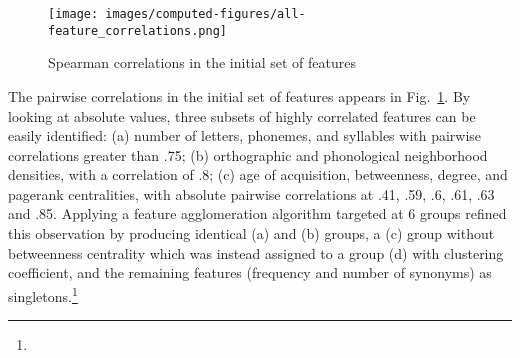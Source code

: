 
\begin{figure}[!th]
    \centering
    \texttt{[image: images/computed-figures/all-feature\_correlations.png]}
    \caption{Spearman correlations in the initial set of features}
    \label{fig:feature-corrs-initial}
\end{figure}

\begin{new}

The pairwise correlations in the initial set of features appears in Fig.~\ref{fig:feature-corrs-initial}.
By looking at absolute values, three subsets of highly correlated features can be easily identified:
(a) number of letters, phonemes, and syllables with pairwise correlations greater than .75;
(b) orthographic and phonological neighborhood densities, with a correlation of .8;
(c) age of acquisition, betweenness, degree, and pagerank centralities, with absolute pairwise correlations at .41, .59, .6, .61, .63 and .85.
Applying a feature agglomeration algorithm targeted at 6 groups refined this observation by producing identical (a) and (b) groups, a (c) group without betweenness centrality which was instead assigned to a group (d) with clustering coefficient, and the remaining features (frequency and number of synonyms) as singletons.\footnote{
}
\end{new}

